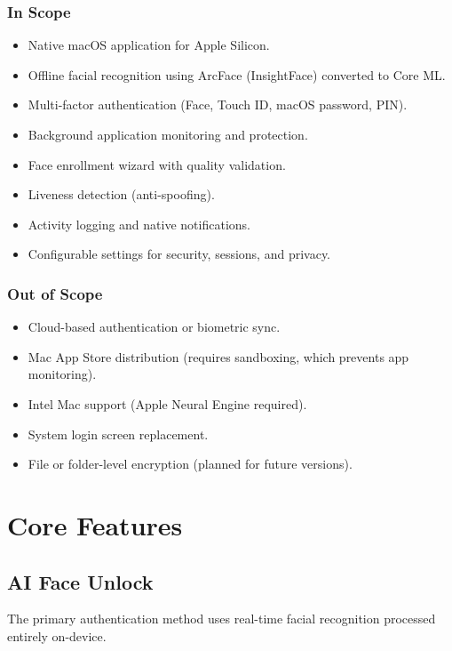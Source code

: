 \documentclass[12pt,a4paper]{report}
\begin{document}
\subsection{In Scope}
\begin{itemize}[noitemsep]
    \item Native macOS application for Apple Silicon.
    \item Offline facial recognition using ArcFace (InsightFace) converted to Core ML.
    \item Multi-factor authentication (Face, Touch ID, macOS password, PIN).
    \item Background application monitoring and protection.
    \item Face enrollment wizard with quality validation.
    \item Liveness detection (anti-spoofing).
    \item Activity logging and native notifications.
    \item Configurable settings for security, sessions, and privacy.
\end{itemize}

\subsection{Out of Scope}
\begin{itemize}[noitemsep]
    \item Cloud-based authentication or biometric sync.
    \item Mac App Store distribution (requires sandboxing, which prevents app monitoring).
    \item Intel Mac support (Apple Neural Engine required).
    \item System login screen replacement.
    \item File or folder-level encryption (planned for future versions).
\end{itemize}

\chapter{Core Features}

\section{AI Face Unlock}
The primary authentication method uses real-time facial recognition processed entirely on-device.
\end{document}
